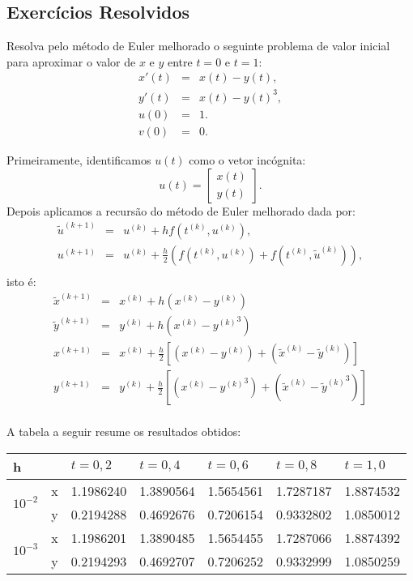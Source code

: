 \subsection*{Exercícios Resolvidos}
\begin{exeresol} Resolva pelo método de Euler melhorado o seguinte problema de valor inicial para aproximar o valor de $x$ e $y$ entre $t=0$ e $t=1$:
\begin{eqnarray*}
x'(t)&=&x(t)-y(t),\\
y'(t)&=&x(t)-y(t)^3,\\
u(0)&=&1.\\
v(0)&=&0.
\end{eqnarray*}
\end{exeresol}
\begin{resol}
 Primeiramente, identificamos $u(t)$ como o vetor incógnita:
 $$u(t)=\left[\begin{array}{c}x(t)\\y(t)\end{array}\right].$$
Depois aplicamos a recursão do método de Euler melhorado dada por:
 \begin{eqnarray*}
\tilde{u}^{(k+1)}&=&u^{(k)}+hf(t^{(k)},u^{(k)}),\\
u^{(k+1)}&=&u^{(k)}+\frac{h}{2}\left(f(t^{(k)},u^{(k)})+f(t^{(k)},\tilde{u}^{(k)})\right),\\
\end{eqnarray*}
isto é:
 \begin{eqnarray*}
\tilde{x}^{(k+1)}&=&x^{(k)}+h\left(x^{(k)}-y^{(k)}\right)\\
\tilde{y}^{(k+1)}&=&y^{(k)}+h\left(x^{(k)}-{y^{(k)}}^3\right)\\
{x}^{(k+1)}&=&x^{(k)}+\frac{h}{2}\left[\left({x}^{(k)}-{y}^{(k)}\right)+\left(\tilde{x}^{(k)}-\tilde{y}^{(k)}\right)\right]\\
{y}^{(k+1)}&=&y^{(k)}+\frac{h}{2}\left[\left({x}^{(k)}-{{y}^{(k)}}^3\right)+ \left(\tilde{x}^{(k)}-\left.{\tilde{y}^{(k)}}\right.^3\right)\right]\\
 \end{eqnarray*}

 A tabela a seguir resume os resultados obtidos:
 
 
 \begin{center}
 \begin{tabular}{|l|l|l|l|l|l|l|}%
\hline
   h&&$t=0,2$&$t=0,4$&$t=0,6$&$t=0,8$&$t=1,0$\\
   \hline
   \multirow{2}{*}{$10^{-2}$} &x  &1.1986240 &1.3890564 &1.5654561 &1.7287187 &1.8874532 \\
			       &y&0.2194288 &0.4692676 &0.7206154 &0.9332802 &1.0850012 \\			
   \hline
  \multirow{2}{*}{$10^{-3}$} &x  &1.1986201 &1.3890485 &1.5654455 &1.7287066 &1.8874392\\
			       &y &0.2194293 &0.4692707 &0.7206252 &0.9332999 &1.0850259\\
			       \hline
 

\end{tabular}
\end{center}
\end{resol}
